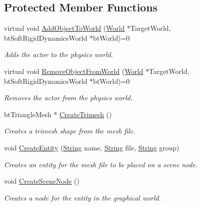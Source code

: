 \subsection*{Protected Member Functions}
\begin{DoxyCompactItemize}
\item 
virtual void \hyperlink{classphys_1_1ActorBase_ac5d4ad5a634b16000742f506ed5957fb}{AddObjectToWorld} (\hyperlink{classphys_1_1World}{World} $\ast$TargetWorld, btSoftRigidDynamicsWorld $\ast$btWorld)=0
\begin{DoxyCompactList}\small\item\em Adds the actor to the physics world. \item\end{DoxyCompactList}\item 
virtual void \hyperlink{classphys_1_1ActorBase_af669724f10d0bf74f4951c85caa42494}{RemoveObjectFromWorld} (\hyperlink{classphys_1_1World}{World} $\ast$TargetWorld, btSoftRigidDynamicsWorld $\ast$btWorld)=0
\begin{DoxyCompactList}\small\item\em Removes the actor from the physics world. \item\end{DoxyCompactList}\item 
btTriangleMesh $\ast$ \hyperlink{classphys_1_1ActorBase_a4d2137276c50bbe5bc8cf9ecc66581b7}{CreateTrimesh} ()
\begin{DoxyCompactList}\small\item\em Creates a trimesh shape from the mesh file. \item\end{DoxyCompactList}\item 
void \hyperlink{classphys_1_1ActorBase_aff7dbb190fb982a43123bee3066501c4}{CreateEntity} (\hyperlink{namespacephys_aa03900411993de7fbfec4789bc1d392e}{String} name, \hyperlink{namespacephys_aa03900411993de7fbfec4789bc1d392e}{String} file, \hyperlink{namespacephys_aa03900411993de7fbfec4789bc1d392e}{String} group)
\begin{DoxyCompactList}\small\item\em Creates an entity for the mesh file to be placed on a scene node. \item\end{DoxyCompactList}\item 
void \hyperlink{classphys_1_1ActorBase_a125d6f0a0b4072e64490638c074eea2d}{CreateSceneNode} ()
\begin{DoxyCompactList}\small\item\em Creates a node for the entity in the graphical world. \item\end{DoxyCompactList}\item 

\end{DoxyCompactItemize}

